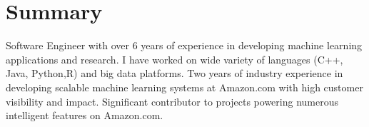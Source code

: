 \documentclass[10pt,a4paper,sans]{moderncv}        %
\begin{document}
\makecvtitle
\section{Summary}
Software Engineer with over 6 years of experience in developing machine learning applications and research. I have worked on wide variety of languages (C++, Java, Python,R) and big data platforms.  Two years of industry experience in developing scalable machine learning systems at Amazon.com with high customer visibility and impact. Significant contributor to projects powering numerous intelligent features on Amazon.com.
\end{document}

